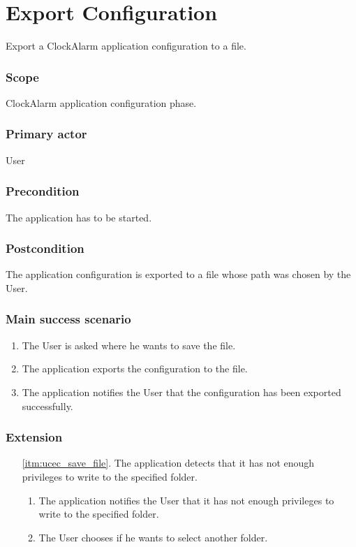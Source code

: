 \section{Export Configuration}\label{subsec:usecase_export_configuration}
Export a ClockAlarm application configuration to a file.
\subsubsection{Scope}
ClockAlarm application configuration phase.
\subsubsection{Primary actor}
User
\subsubsection{Precondition}
The application has to be started.
\subsubsection{Postcondition}
The application configuration is exported to a file whose path was chosen by the User.
\subsubsection{Main success scenario}
\begin{enumerate}
	\item\label{itm:ucec_save_file} The User is asked where he wants to save the file.
	\item The application exports the configuration to the file.
	\item The application notifies the User that the configuration has been exported successfully.
\end{enumerate}
\subsubsection{Extension}
\begin{enumerate}
	\item[\ref{itm:ucec_save_file}.] The application detects that it has not enough privileges to write to the specified folder.
	\begin{enumerate}[i]
		\item The application notifies the User that it has not enough privileges to write to the specified folder.
		\item The User chooses if he wants to select another folder.
	\end{enumerate}
\end{enumerate}
